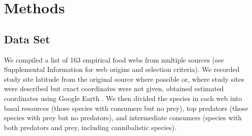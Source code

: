 \documentclass[12pt]{article}
\begin{document}
\section*{Methods}

\subsection*{Data Set} 

  We compiled a list of 163 empirical food webs from
  multiple sources (see Supplemental Information for web origins and selection
  criteria). We recorded study site latitude from the original source where
  possible or, where study sites were described but exact coordinates were not
  given, obtained estimated coordinates using Google Earth \citep{GoogleEarth}.
  We then divided the species in each web into basal resources (those species with
  consumers but no prey), top predators (those species with prey but no predators),
  and intermediate consumers (species with both predators and prey, including cannibalistic
  species). 

\end{document}
